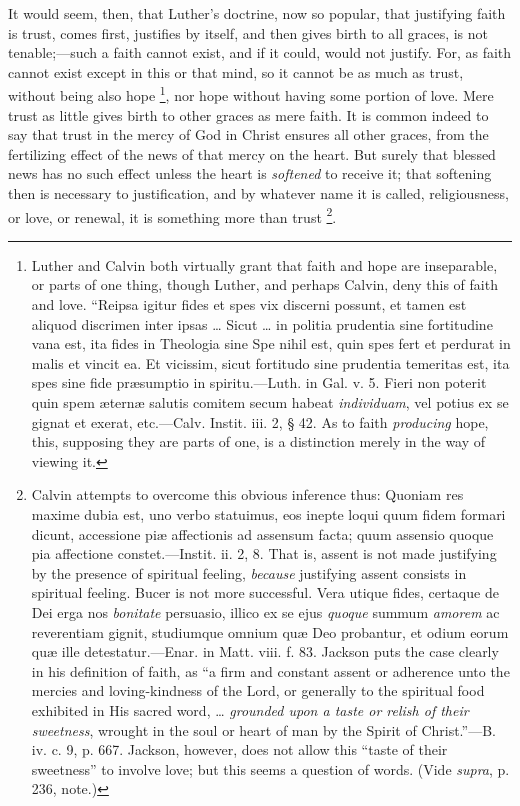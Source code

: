 It would seem, then, that Luther's doctrine, now so popular, that
justifying faith is trust, comes first, justifies by itself, and then
gives birth to all graces, is not tenable;—such a faith cannot
exist, and if it could, would not justify. For, as faith cannot exist
except in this or that mind, so it cannot be as much as trust, without
being also hope \footnote{Luther and
Calvin both virtually grant that faith and hope are inseparable, or
parts of one thing, though Luther, and perhaps Calvin, deny this of
faith and love. ``Reipsa igitur fides et spes vix discerni possunt,
et tamen est aliquod discrimen inter ipsas … Sicut … in politia
prudentia sine fortitudine vana est, ita fides in Theologia sine Spe
nihil est, quin spes fert et perdurat in malis et vincit ea. Et
vicissim, sicut fortitudo sine prudentia temeritas est, ita spes sine
fide præsumptio in spiritu.—Luth. in Gal. v. 5. Fieri non poterit
quin spem æternæ salutis comitem secum habeat \emph{individuam}, vel
potius ex se gignat et exerat, etc.—Calv. Instit. iii. 2, § 42. As
to faith \emph{producing} hope, this, supposing they are parts of one,
is a distinction merely in the way of viewing it.}, nor hope
without having some portion of love. Mere trust as little gives
birth to other graces as mere faith. It is common indeed to say that
trust in the mercy of God in Christ ensures all other graces, from the
fertilizing effect of the news of that mercy on the heart. But surely
that blessed news has no such effect unless the heart is \emph{softened}
to receive it; that softening then is necessary to justification, and
by whatever name it is called, religiousness, or love, or renewal, it
is something more than trust \footnote{Calvin attempts
to overcome this obvious inference thus: Quoniam res maxime dubia est,
uno verbo statuimus, eos inepte loqui quum fidem formari dicunt,
accessione piæ affectionis ad assensum facta; quum assensio quoque
pia affectione constet.—Instit. ii. 2, 8. That is, assent is not
made justifying by the presence of spiritual feeling, \emph{because}
justifying assent consists in spiritual feeling. Bucer is not more
successful. Vera utique fides, certaque de Dei erga nos \emph{bonitate}
persuasio, illico ex se ejus \emph{quoque} summum \emph{amorem} ac
reverentiam gignit, studiumque omnium quæ Deo probantur, et odium
eorum quæ ille detestatur.—Enar. in Matt. viii. f. 83. Jackson puts
the case clearly in his definition of faith, as ``a firm and
constant assent or adherence unto the mercies and loving-kindness of
the Lord, or generally to the spiritual food exhibited in His sacred
word, … \emph{grounded upon a taste or relish of their sweetness},
wrought in the soul or heart of man by the Spirit of Christ.''—B.
iv. c. 9, p. 667. Jackson, however, does not allow this ``taste of
their sweetness'' to involve love; but this seems a question of
words. (Vide \emph{supra}, p. 236, note.)}.

